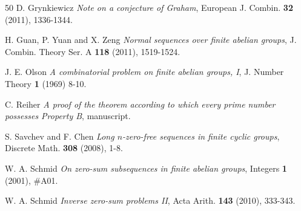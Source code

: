 \documentclass[english,12pt,a4paper,twoside]{smfart}
\theoremstyle{plain}
\theoremstyle{definition}
\theoremstyle{remark}
\begin{document}
\begin{thebibliography}{50}
{\sc D. Grynkiewicz} {\it Note on a conjecture of Graham}, 
European J. Combin. {\bf 32} (2011), 1336-1344.

{\sc H. Guan, P. Yuan and X. Zeng} {\it Normal sequences over finite abelian groups},
J. Combin. Theory Ser. A {\bf 118} (2011), 1519-1524.

{\sc J. E. Olson} {\it A combinatorial problem on finite abelian groups, I}, 
J. Number Theory {\bf 1} (1969) 8-10.
 
{\sc C. Reiher} {\it A proof of the theorem according to which every prime number possesses Property B}, manuscript.
 
 {\sc S. Savchev and F. Chen} {\it Long $n$-zero-free sequences in finite cyclic groups}, 
Discrete Math. {\bf 308} (2008), 1-8.

 {\sc W. A. Schmid} {\it On zero-sum subsequences in finite abelian groups}, 
Integers {\bf 1} (2001), $\#$A01.

{\sc W. A. Schmid} {\it Inverse zero-sum problems II}, 
Acta Arith. {\bf 143} (2010), 333-343.

\end{thebibliography}
\end{document}
